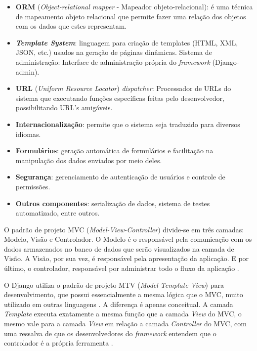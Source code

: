  \begin{itemize}

	\item \textbf{ORM} (\textit{Object-relational mapper} - Mapeador objeto-relacional): é
uma técnica de mapeamento objeto relacional que permite fazer uma
relação dos objetos com os dados que estes representam.
	\item \textbf{\textit{Template System}}: linguagem para criação de templates (HTML, XML,
JSON, etc.) usados na geração de páginas dinâmicas.
Sistema de administração: Interface de administração própria do
\textit{framework} (Django-admin).
	\item \textbf{URL} (\textit{Uniform Resource Locator}) \textit{dispatcher}: Processador de URLs
do sistema que executando funções específicas feitas pelo
desenvolvedor, possibilitando URL’s amigáveis.
	\item \textbf{Internacionalização}: permite que o sistema seja traduzido para
diversos idiomas.
	\item \textbf{Formulários}: geração automática de formulários e facilitação na
manipulação dos dados enviados por meio deles.
	\item \textbf{Segurança}: gerenciamento de autenticação de usuários e controle de
permissões.
	\item \textbf{Outros componentes}: serialização de dados, sistema de testes
automatizado, entre outros.

\end{itemize}

O padrão de projeto MVC (\textit{Model-View-Controller}) divide-se em três camadas: Modelo, Visão e
Controlador. O Modelo é o responsável pela comunicação com os dados
armazenados no banco de dados que serão visualizados na camada de Visão. A
Visão, por sua vez, é responsável pela apresentação da aplicação. E por último, o
controlador, responsável por administrar todo o fluxo da aplicação \cite{lemos}.

O Django utiliza o padrão de projeto MTV (\textit{Model-Template-View}) para
desenvolvimento, que possui essencialmente a mesma lógica que o MVC,
muito utilizado em outras linguagens \cite{neto}. A diferença é apenas conceitual. A camada \textit{Template}
executa exatamente a mesma função que a camada \textit{View} do MVC, o mesmo vale para a camada \textit{View} em
relação a camada \textit{Controller} do MVC, com uma ressalva de que os desenvolvedores do \textit{framework} entendem
que o controlador é a própria ferramenta \cite{django}.


